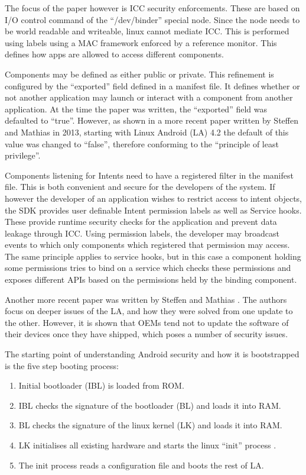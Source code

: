 The focus of the paper however is ICC security enforcements. These are based on I/O control command of the ``/dev/binder'' special node. Since the node needs to be world readable and writeable, linux cannot mediate ICC. This is performed using labels using a MAC framework enforced by a reference monitor. This defines how apps are allowed to access different components.

Components may be defined as either public or private. This refinement is configured by the ``exported'' field defined in a manifest file. It defines whether or not another application may launch or interact with a component from another application. At the time the paper was written, the ``exported'' field was defaulted to ``true''. However, as shown in a more recent paper \cite{} written by Steffen and Mathias in 2013, starting with Linux Android (LA) 4.2  the default of this value was changed to ``false'', therefore conforming to the ``principle of least privilege''.

Components listening for Intents need to have a registered filter in the manifest file. This is both convenient and secure for the developers of the system. If however the developer of an application wishes to restrict access to intent objects, the SDK provides user definable Intent permission labels as well as Service hooks. These provide runtime security checks for the application and prevent data leakage through ICC. Using permission labels, the developer may broadcast events to which only components which registered that permission may access. The same principle applies to service hooks, but in this case a component holding some permissions tries to bind on a service which checks these permissions and exposes different APIs based on the permissions held by the binding component.

Another more recent paper was written by Steffen and Mathias \cite{}. The authors focus on deeper issues of the LA, and how they were solved from one update to the other. However, it is shown that OEMs tend not to update the software of their devices once they have shipped, which poses a number of security issues.

The starting point of understanding Android security and how it is bootstrapped is the five step booting process:
\begin{enumerate}
	\item Initial bootloader (IBL) is loaded from ROM.
	\item IBL checks the signature of the bootloader (BL) and loads it into RAM.
	\item BL checks the signature of the linux kernel (LK) and loads it into RAM.
	\item LK initialises all existing hardware and starts the linux ``init'' process \cite{SPECIFY WHAT THIS IS FROM PAPER}.
	\item The init process reads a configuration file and boots the rest of LA.
\end{enumerate}

